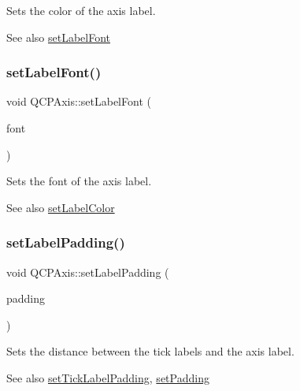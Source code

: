 Sets the color of the axis label.

\begin{DoxySeeAlso}{See also}
\hyperlink{classQCPAxis_a71ac1a47f7547e490a8c4311d1433cf3}{set\+Label\+Font} 
\end{DoxySeeAlso}
\mbox{\label{classQCPAxis_a71ac1a47f7547e490a8c4311d1433cf3}} 
\subsubsection{\texorpdfstring{set\+Label\+Font()}{setLabelFont()}}
{\footnotesize\ttfamily void Q\+C\+P\+Axis\+::set\+Label\+Font (\begin{DoxyParamCaption}\item[{const Q\+Font \&}]{font }\end{DoxyParamCaption})}

Sets the font of the axis label.

\begin{DoxySeeAlso}{See also}
\hyperlink{classQCPAxis_a6c906fe56d75f0122335b9f79b999608}{set\+Label\+Color} 
\end{DoxySeeAlso}
\mbox{\label{classQCPAxis_a4391192a766e5d20cfe5cbc17607a7a2}} 
\subsubsection{\texorpdfstring{set\+Label\+Padding()}{setLabelPadding()}}
{\footnotesize\ttfamily void Q\+C\+P\+Axis\+::set\+Label\+Padding (\begin{DoxyParamCaption}\item[{int}]{padding }\end{DoxyParamCaption})}

Sets the distance between the tick labels and the axis label.

\begin{DoxySeeAlso}{See also}
\hyperlink{classQCPAxis_af302c479af9dbc2e9f0e44e07c0012ee}{set\+Tick\+Label\+Padding}, \hyperlink{classQCPAxis_a5691441cb3de9e9844855d339c0db279}{set\+Padding} 
\end{DoxySeeAlso}
\mbox{\label{classQCPAxis_a08af1c72db9ae4dc8cb8a973d44405ab}} 
